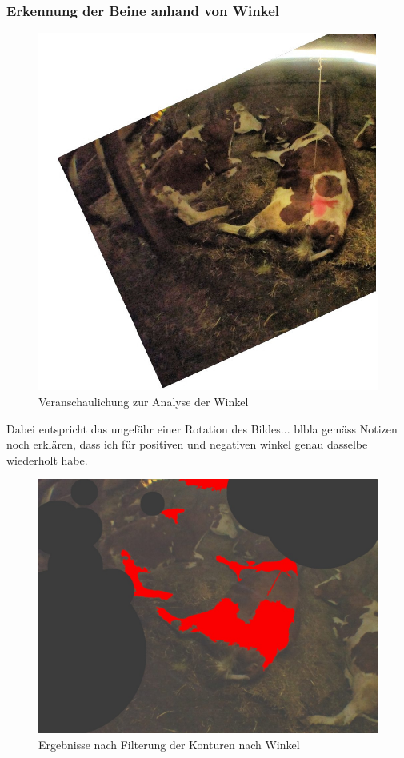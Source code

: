 \subsubsection{Erkennung der Beine anhand von Winkel}
\begin{figure}[H]
	\center
	\includegraphics[scale=1.8]{Grafiken/entwicklung/21AngleCorrecturDemonstration.jpg}
	\caption{Veranschaulichung zur Analyse der Winkel} 
	\label{fig: Veranschaulichung zur Analyse der Winkel} 
\end{figure}


Dabei entspricht das ungefähr einer Rotation des Bildes... blbla gemäss Notizen
noch erklären, dass ich für positiven und negativen winkel genau dasselbe wiederholt habe.

\begin{figure}[H]
	\center
	\includegraphics[scale=0.43]{Grafiken/entwicklung/22AngleCorrectur.jpg}
	\caption{Ergebnisse nach Filterung der Konturen nach Winkel} 
	\label{fig: Ergebnisse nach Filterung der Konturen nach Winkel} 
\end{figure}
